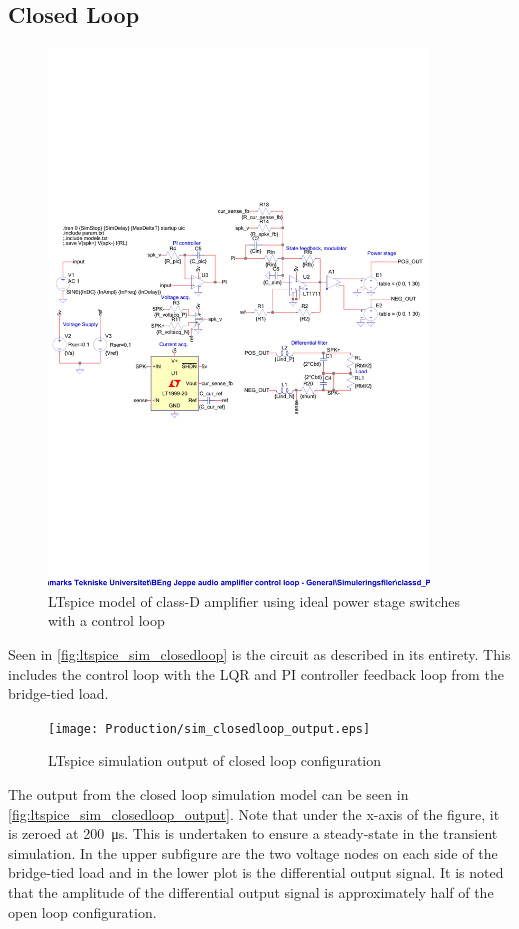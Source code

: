 \subsection{Closed Loop}
\begin{figure}[htbp]
	\centering
	\includegraphics[width=0.9\textwidth,trim=5 230 5 230, clip]{0_Figures/Production/ltspice_sim_regulator.pdf}
	\caption{LTspice model of class-D amplifier using ideal power stage switches with a control loop}
	\label{fig:ltspice_sim_closedloop}
\end{figure}
Seen in \autoref{fig:ltspice_sim_closedloop} is the circuit as described in its entirety. This includes the control loop with the LQR and PI controller feedback loop from the bridge-tied load.

\begin{figure}[htbp]
	\centering
	\texttt{[image: Production/sim\_closedloop\_output.eps]}
	\caption{LTspice simulation output of closed loop configuration}
	\label{fig:ltspice_sim_closedloop_output}
\end{figure}
The output from the closed loop simulation model can be seen in \autoref{fig:ltspice_sim_closedloop_output}. Note that under the x-axis of the figure, it is zeroed at \SI{200}{\micro\second}. This is undertaken to ensure a steady-state in the transient simulation. In the upper subfigure are the two voltage nodes on each side of the bridge-tied load and in the lower plot is the differential output signal. It is noted that the amplitude of the differential output signal is approximately half of the open loop configuration.
\clearpage
